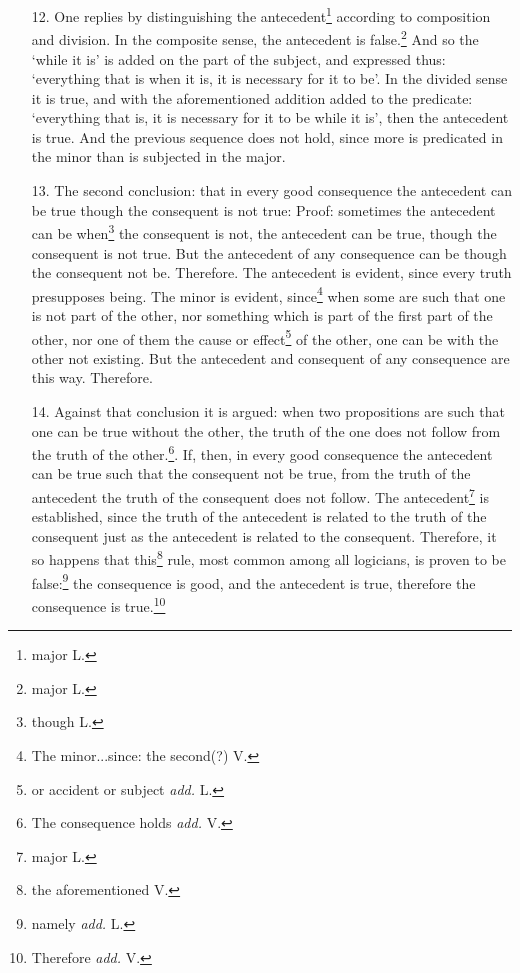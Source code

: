 \documentclass[]{article}
\begin{document}
\begin{enumerate}
	\item[12.] One replies by distinguishing the antecedent\footnote{major L.} according to composition and division. In the composite sense, the antecedent is false.\footnote{major L.} And so the `while it is' is added on the part of the subject, and expressed thus: `everything that is when it is, it is necessary for it to be'. In the divided sense it is true, and with the aforementioned addition added to the predicate: `everything that is, it is necessary for it to be while it is', then the antecedent is true. And the previous sequence does not hold, since more is predicated in the minor than is subjected in the major. 
	\item[13.] The second conclusion: that in every good consequence the antecedent can be true though the consequent is not true: Proof: sometimes the antecedent can be when\footnote{though L.} the consequent is not, the antecedent can be true, though the consequent is not true. But the antecedent of any consequence can be though the consequent not be. Therefore. The antecedent is evident, since every truth presupposes being. The minor is evident, since\footnote{The minor...since: the second(?) V.} when some are such that one is not part of the other, nor something which is part of the first part of the other, nor one of them the cause or effect\footnote{or accident or subject \textit{add.} L.} of the other, one can be with the other not existing. But the antecedent and consequent of any consequence are this way. Therefore.
	\item[14.] Against that conclusion it is argued: when two propositions are such that one can be true without the other, the truth of the one does not follow from the truth of the other.\footnote{The consequence holds \textit{add.} V.}. If, then, in every good consequence the antecedent can be true such that the consequent not be true, from the truth of the antecedent the truth of the consequent does not follow. The antecedent\footnote{major L.} is established, since the truth of the antecedent is related to the truth of the consequent just as the antecedent is related to the consequent. Therefore, it so happens that this\footnote{the aforementioned V.} rule, most common among all logicians, is proven to be false:\footnote{namely \textit{add.} L.} the consequence is good, and the antecedent is true, therefore the consequence is true.\footnote{Therefore \textit{add.} V.}

\end{enumerate}
\end{document}
